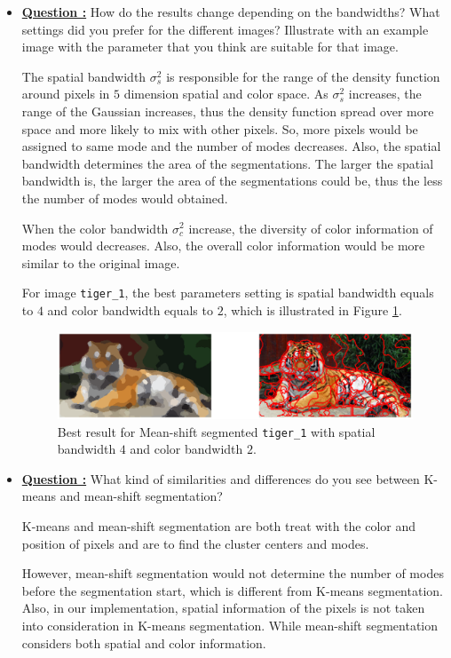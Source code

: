 \documentclass[11pt,a4paper]{article}
\begin{document}
\begin{itemize}
	\item\addtocounter{Counter}{1}\underline{\textbf{Question :}} How do the results change depending on the bandwidths? What settings did you prefer for the different images? Illustrate with an example image with the parameter that you think are suitable for that image.
	\par The spatial bandwidth $\sigma_{s}^{2}$ is responsible for the range of the density function around pixels in $5$ dimension spatial and color space. As $\sigma_{s}^{2}$ increases, the range of the Gaussian increases, thus the density function spread over more space and more likely to mix with other pixels. So, more pixels would be assigned to same mode and the number of modes decreases. Also, the spatial bandwidth determines the area of the segmentations. The larger the spatial bandwidth is, the larger the area of the segmentations could be, thus the less the number of modes would obtained.
	\par When the color bandwidth $\sigma_{c}^{2}$ increase, the diversity of color information of modes would decreases. Also, the overall color information would be more similar to the original image.
	\par For image \texttt{tiger\_1}, the best parameters setting is spatial bandwidth equals to $4$ and color bandwidth equals to $2$, which is illustrated in Figure \ref{fig:Meanshift_Tiger1_Best_Result_S_4_C_2}.
	\begin{figure}[!ht]
		\centering
		\includegraphics[width=\columnwidth]{Meanshift_Tiger1_Best_Result_S_4_C_2.eps}
		\caption{Best result for Mean-shift segmented \texttt{tiger\_1} with spatial bandwidth $4$ and color bandwidth $2$.}
		\label{fig:Meanshift_Tiger1_Best_Result_S_4_C_2}
	\end{figure}
	
	\item\addtocounter{Counter}{1}\underline{\textbf{Question :}} What kind of similarities and differences do you see between K-means and mean-shift segmentation?
		\par K-means and mean-shift segmentation are both treat with the color and position of pixels and are to find the cluster centers and modes.
		\par However, mean-shift segmentation would not determine the number of modes before the segmentation start, which is different from K-means segmentation. Also, in our implementation, spatial information of the pixels is not taken into consideration in K-means segmentation. While mean-shift segmentation considers both spatial and color information.
	
\end{itemize}
\end{document}
